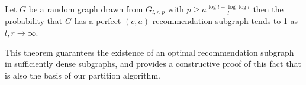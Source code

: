 \begin{thm}\label{perfect}
Let $G$ be a random graph drawn from $G_{l, r, p}$ with $p\geq a\frac{\log l-\log\log
l}{l}$ then the probability that $G$ has a perfect $(c, a)$-recommendation
subgraph tends to 1 as $l,r\to\infty$.
\end{thm}

This theorem guarantees the existence of an optimal recommendation subgraph in sufficiently dense subgraphs, and provides a constructive proof of this fact that is also the basis of our partition algorithm.  

%
%
%
%

